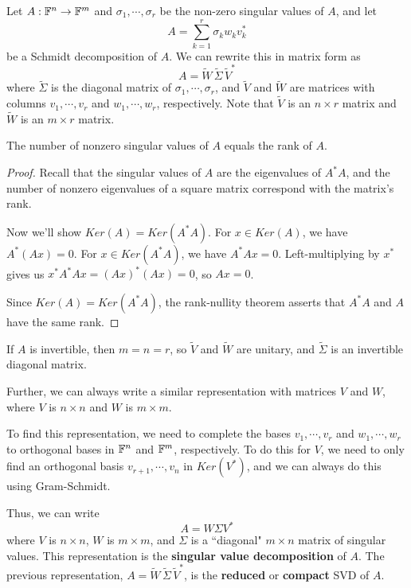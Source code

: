Let $A : \mathbb{F}^{n} \rightarrow \mathbb{F}^{m}$ and $\sigma_{1}, \cdots, \sigma_{r}$ be the non-zero singular values of $A$, and let 
$$A = \sum_{k=1}^{r} \sigma_{k} w_{k} v_{k}^{*}$$ 
be a Schmidt decomposition of $A$. We can rewrite this in matrix form as 
$$A = \widetilde{W} \, \widetilde{\Sigma} \, \widetilde{V}^{*}$$
where $\widetilde{\Sigma}$ is the diagonal matrix of $\sigma_{1}, \cdots, \sigma_{r}$, and $\widetilde{V}$ and $\widetilde{W}$ are matrices with columns $v_{1}, \cdots, v_{r}$ and $w_{1}, \cdots, w_{r}$, respectively. Note that $\widetilde{V}$ is an $n \times r$ matrix and $\widetilde{W}$ is an $m \times r$ matrix. 

\begin{theorem}
The number of nonzero singular values of $A$ equals the rank of $A$.
\end{theorem}

\begin{proof}
Recall that the singular values of $A$ are the eigenvalues of $A^{*}A$, and the number of nonzero eigenvalues of a square matrix correspond with the matrix's rank.  

Now we'll show $Ker(A) = Ker(A^{*}A)$. For $x \in Ker(A)$, we have $A^{*} (Ax) = 0$. For $x \in Ker(A^{*}A)$, we have $A^{*}Ax = 0$. Left-multiplying by $x^{*}$ gives us $x^{*} A^{*} A x = (Ax)^{*} (Ax) = 0$, so $Ax = 0$. 

Since $Ker(A) = Ker(A^{*}A)$, the rank-nullity theorem asserts that $A^{*}A$ and $A$ have the same rank. 
\end{proof}

If $A$ is invertible, then $m = n = r$, so $\widetilde{V}$ and $\widetilde{W}$ are unitary, and $\widetilde{\Sigma}$ is an invertible diagonal matrix. 

Further, we can always write a similar representation with matrices $V$ and $W$, where $V$ is $n \times n$ and $W$ is $m \times m$. 

To find this representation, we need to complete the bases $v_{1}, \cdots, v_{r}$ and $w_{1}, \cdots, w_{r}$ to orthogonal bases in $\mathbb{F}^{n}$ and $\mathbb{F}^{m}$, respectively. To do this for $V$, we need to only find an orthogonal basis $v_{r+1}, \cdots, v_{n}$ in $Ker(V^{*})$, and we can always do this using Gram-Schmidt. 

Thus, we can write 
$$A = W \Sigma V^{*}$$
where $V$ is $n \times n$, $W$ is $m \times m$, and $\Sigma$ is a ``diagonal" $m \times n$ matrix of singular values. This representation is the \textbf{singular value decomposition} of $A$. The previous representation, $A = \widetilde{W} \, \widetilde{\Sigma} \, \widetilde{V}^{*}$, is the \textbf{reduced} or \textbf{compact} SVD of $A$.

